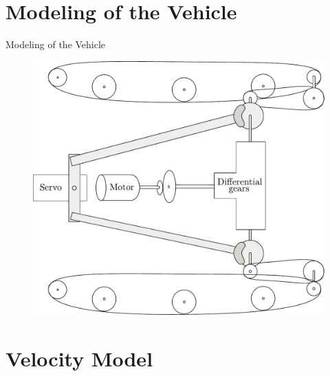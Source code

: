 
\section{Modeling of the Vehicle}

\begin{frame}{Modeling of the Vehicle}{}
  
  \begin{figure}[H]
	\centering
	\includegraphics[scale=0.4]{Pictures/completeMechanical.pdf}
\end{figure}
  
\end{frame}

\section{Velocity Model}

